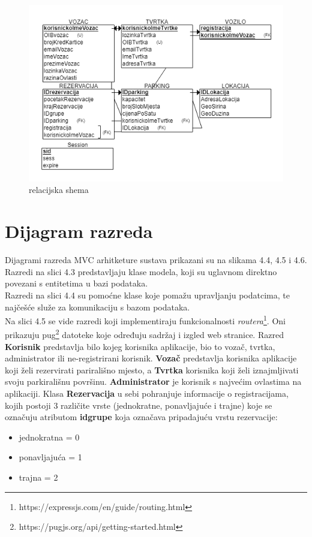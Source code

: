 				\begin{figure}[H]
					\includegraphics[scale=0.8]{dijagrami/ParkirajMeRelShema.png} %
					\centering
					\caption{relacijska shema}
					\label{fig:promjene}
				\end{figure}


			

			\eject
			
			
		\section{Dijagram razreda}
		
			Dijagrami razreda MVC arhitketure sustava prikazani su na slikama 4.4, 4.5 i 4.6.\\
			Razredi na slici 4.3 predstavljaju klase modela, koji su uglavnom direktno povezani s entitetima u bazi podataka. \\
			Razredi na slici 4.4 su pomoćne klase koje pomažu upravljanju podatcima, te najčešće služe za komunikaciju s bazom podataka.\\
 		    Na slici 4.5 se vide razredi koji implementiraju funkcionalnosti \textit{routera}\footnote{https://expressjs.com/en/guide/routing.html}. Oni prikazuju pug\footnote{https://pugjs.org/api/getting-started.html} datoteke koje određuju sadržaj i izgled web stranice.
			\newline
			Razred \textbf{Korisnik} predstavlja bilo kojeg korisnika aplikacije, bio to vozač, tvrtka, administrator ili ne-registrirani korisnik. \textbf{Vozač} predstavlja korisnika aplikacije koji želi rezervirati parirališno mjesto, a \textbf{Tvrtka} korisnika koji želi iznajmljivati svoju parkirališnu površinu. \textbf{Administrator} je korisnik s najvećim ovlastima na aplikaciji. 
			Klasa \textbf{Rezervacija} u sebi pohranjuje informacije o registracijama, kojih postoji 3 različite vrste (jednokratne, ponavljajuće i trajne) koje se označuju atributom \textbf{idgrupe} koja označava pripadajuću vrstu rezervacije:
			\begin{itemize}
				\item jednokratna 	= 0
				\item ponavljajuća 	= 1
				\item trajna 		= 2
			\end{itemize}
			
